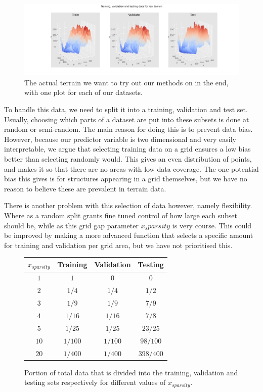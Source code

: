 \documentclass[11pt, a4paper]{report}
\begin{document}
\begin{figure}
\includegraphics[width=\textwidth]{../plots/real_terrain.png}
\caption{The actual terrain we want to try out our methods on in the end, with one plot for each of our datasets.}
\label{fig:real_terrain}
\end{figure}

To handle this data, we need to split it into a training, validation and test set. Usually, choosing which parts of a dataset are put into these subsets is done at random or semi-random. The main reason for doing this is to prevent data bias. However, because our predictor variable is two dimensional and very easily interpretable, we argue that selecting training data on a grid ensures a low bias better than selecting randomly would. This gives an even distribution of points, and makes it so that there are no areas with low data coverage. The one potential bias this gives is for structures appearing in a grid themselves, but we have no reason to believe these are prevalent in terrain data.

There is another problem with this selection of data however, namely flexibility. Where as a random split grants fine tuned control of how large each subset should be, while as this grid gap parameter $x_sparsity$ is very course. This could be improved by making a more advanced function that selects a specific amount for training and validation per grid area, but we have not prioritised this.

\begin{figure}
\begin{center}
\caption{Portion of total data that is divided into the training, validation and testing sets respectively for different values of $x_{sparsity}$.}
\begin{tabular}{| c | c | c | c |}
\hline
$x_{sparsity}$ & \textbf{Training} & \textbf{Validation} & \textbf{Testing} \\
\hline
$1$ & $1$ & $0$ & $0$ \\
\hline
$2$ & $1/4$ & $1/4$ & $1/2$ \\
\hline
$3$ & $1/9$ & $1/9$ & $7/9$ \\
\hline
$4$ & $1/16$ & $1/16$ & $7/8$ \\
\hline
$5$ & $1/25$ & $1/25$ & $23/25$ \\
\hline
$10$ & $1/100$ & $1/100$ & $98/100$ \\
\hline
$20$ & $1/400$ & $1/400$ & $398/400$ \\
\hline
\end{tabular}
\label{table:xsparsity}
\end{center}
\end{figure}
\end{document}
